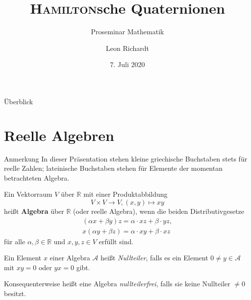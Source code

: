 \documentclass[aspectratio=169]{beamer}
\title{\textsc{Hamilton}sche Quaternionen}
\subtitle{Proseminar Mathematik}
\author[L.~Richardt]{Leon Richardt}
\date[2020-07-07]{7. Juli 2020}
\institute{Universität Osnabrück}
\newcommand{\R}{\ensuremath{\mathbb{R}}{ }}
\begin{document}
    \nocite{ebbinghaus_zahlen_1992}

    \begin{frame}
        \titlepage
    \end{frame}

    \begin{frame}{Überblick}
        \tableofcontents
    \end{frame}

    \section{Reelle Algebren}
    \begin{frame}
        \begin{block}{Anmerkung}
            In dieser Präsentation stehen kleine griechische Buchstaben stets für reelle Zahlen; lateinische Buchstaben stehen für Elemente der momentan betrachteten Algebra.
        \end{block}
    \end{frame}

    \begin{frame}
        \begin{definition}
            Ein Vektorraum \(V\) über \R mit einer Produktabbildung
            \[
                V \times V \to V, (x, y) \mapsto xy
            \]
            heißt \textbf{Algebra} über \R (oder reelle Algebra), wenn die beiden Distributivgesetze
            \begin{gather*}
                (\alpha x + \beta y) z = \alpha \cdot xz + \beta \cdot yz, \\
                x (\alpha y + \beta z) = \alpha \cdot xy + \beta \cdot xz
            \end{gather*}
            für alle \(\alpha, \beta \in \R\) und \(x, y, z \in V\) erfüllt sind.
        \end{definition}
    \end{frame}

    \begin{frame}
        \begin{definition}
            Ein Element \(x\) einer Algebra \(\mathcal{A}\) heißt \textit{Nullteiler}, falls es ein Element \(0 \neq y \in \mathcal{A}\) mit \(xy = 0\) oder \(yx = 0\) gibt.

            Konsequenterweise heißt eine Algebra \textit{nullteilerfrei}, falls sie keine Nullteiler \(\neq 0\) besitzt.
        \end{definition}
    \end{frame}
\end{document}
